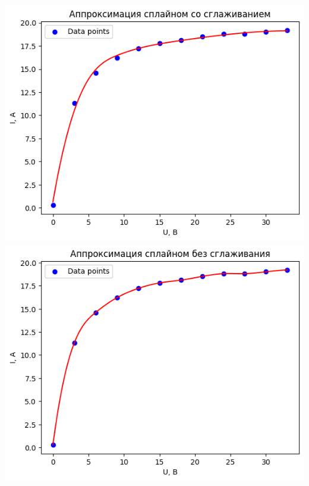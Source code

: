 \documentclass[12pt,openany]{book}
\begin{document}
\begin{center}
    \includegraphics[scale=0.59]{K4-NSY1} \\

    \includegraphics[scale=0.59]{K4-NSY2} \\
\end{center}

\newpage
\end{document}
